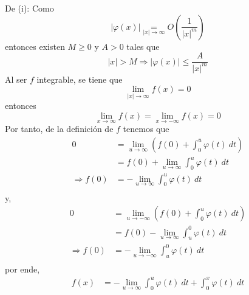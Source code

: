 \documentclass[12pt]{report}
\theoremstyle{largebreak}
\renewcommand{\leq}{\ensuremath{\leqslant}}
\renewcommand{\geq}{\ensuremath{\geqslant}}
\newcommand\abs[1]{\ensuremath{\left|#1\right|}}
\begin{document}
    \begin{sol}
        De (i): Como
        \begin{equation*}
            \abs{\varphi(x)}\underset{\abs{x}\rightarrow\infty}{=}O\left(\frac{1}{\abs{x}^m}\right)
        \end{equation*}
        entonces existen $M\geq0$ y $A>0$ tales que
        \begin{equation*}
            \abs{x}>M\Rightarrow \abs{\varphi(x)}\leq \frac{A}{\abs{x}^m}
        \end{equation*}
        Al ser $f$ integrable, se tiene que
        \begin{equation*}
            \lim_{\abs{x}\rightarrow\infty}f(x)=0
        \end{equation*}
        entonces
        \begin{equation*}
            \lim_{x\rightarrow\infty}f(x)=\lim_{x\rightarrow-\infty}f(x)=0
        \end{equation*}
        Por tanto, de la definición de $f$ tenemos que
        \begin{equation*}
            \begin{split}
                0&=\lim_{u\rightarrow\infty}\left(f(0)+\int_0^u\varphi(t)\:dt\right)\\
                &=f(0)+\lim_{u\rightarrow\infty}\int_0^u\varphi(t)\:dt\\
                \Rightarrow f(0)&=-\lim_{u\rightarrow\infty}\int_0^u\varphi(t)\:dt\\
            \end{split}
        \end{equation*}
        y,
        \begin{equation*}
            \begin{split}
                0&=\lim_{u\rightarrow-\infty}\left(f(0)+\int_0^u\varphi(t)\:dt\right)\\
                &=f(0)-\lim_{u\rightarrow\infty}\int_u^0\varphi(t)\:dt\\
                \Rightarrow f(0)&=-\lim_{u\rightarrow-\infty}\int_u^0\varphi(t)\:dt\\
            \end{split}
        \end{equation*}
        por ende,
        \begin{equation*}
            \begin{split}
                f(x)&=-\lim_{u\rightarrow\infty}\int_0^u\varphi(t)\:dt+\int_0^x\varphi(t)\:dt\\

\end{split}
\end{equation*}
\end{sol}
\end{document}
